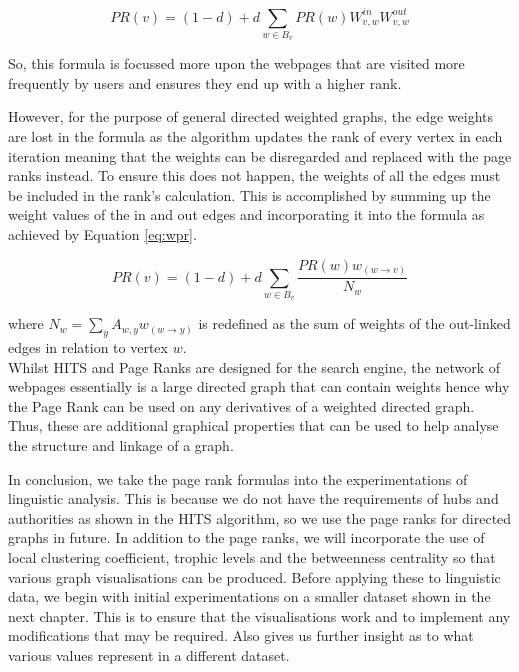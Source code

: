\begin{equation}\label{eq:proverall}
PR(v) = (1 - d) + d\sum_{w \in B_v}PR(w)W^{in}_{v,w}W^{out}_{v,w}
\end{equation}

So, this formula is focussed more upon the webpages that are visited more frequently by users and ensures they end up with a higher rank. 

However, for the purpose of general directed weighted graphs, the edge weights are lost in the formula as the algorithm updates the rank of every vertex in each iteration meaning that the weights can be disregarded and replaced with the page ranks instead. To ensure this does not happen, the weights of all the edges must be included in the rank's calculation. This is accomplished by summing up the weight values of the in and out edges and incorporating it into the formula as achieved by Equation \ref{eq:wpr}.

\begin{equation} \label{eq:wpr}
PR(v) = (1-d) + d\sum_{w \in B_v}\frac{PR(w)w_{(w \rightarrow v)}}{N_w}
\end{equation}

where $N_w = \sum_y{A_{w,y}w_{(w \rightarrow y)}}$ is redefined as the sum of weights of the out-linked edges in relation to vertex $w$.
\\

Whilst HITS and Page Ranks are designed for the search engine, the network of webpages essentially is a large directed graph that can contain weights hence why the Page Rank can be used on any derivatives of a weighted directed graph. Thus, these are additional graphical properties that can be used to help analyse the structure and linkage of a graph. 

In conclusion, we take the page rank formulas into the experimentations of linguistic analysis. This is because we do not have the requirements of hubs and authorities as shown in the HITS algorithm, so we use the page ranks for directed graphs in future. In addition to the page ranks, we will incorporate the use of local clustering coefficient, trophic levels and the betweenness centrality so that various graph visualisations can be produced. Before applying these to linguistic data, we begin with initial experimentations on a smaller dataset shown in the next chapter. This is to ensure that the visualisations work and to implement any modifications that may be required. Also gives us further insight as to what various values represent in a different dataset.
